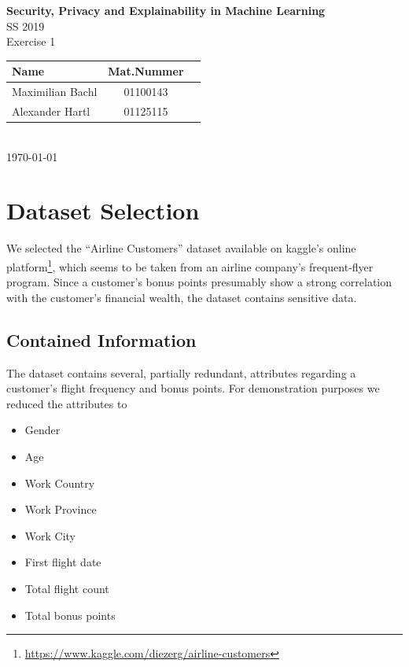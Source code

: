\documentclass[parskip=full]{scrartcl}
\begin{document}
\begin{titlepage}
    \centering
    \vspace*{2cm}
    {\Huge \textbf{Security, Privacy and Explainability in Machine Learning}}\\
    SS 2019\\
    \vspace*{1cm}
    {\Large Exercise 1}
    \\\vspace*{3cm}
    {\large 
        \begin{tabular}{l c c}
            Name & Mat.Nummer \\ \hline
            Maximilian Bachl & 01100143 \\
            Alexander Hartl &  01125115
        \end{tabular}
    }
    \\\vspace*{7cm}
    \today
\end{titlepage}

\section{Dataset Selection}
We selected the ``Airline Customers'' dataset available on kaggle's online platform\footnote{\url{https://www.kaggle.com/diezerg/airline-customers}}, which seems to be taken from an airline company's frequent-flyer program. Since a customer's bonus points presumably show a strong correlation  with the customer's financial wealth, the dataset contains sensitive data.
\subsection{Contained Information}
The dataset contains several, partially redundant, attributes regarding a customer's flight frequency and bonus points.
For demonstration purposes we reduced the attributes to 
\begin{multicols}{2}
\begin{itemize}
\item Gender
\item Age
\item Work Country
\item Work Province
\item Work City
\item First flight date
\item Total flight count
\item Total bonus points
\end{itemize}
\end{multicols}
\end{document}
